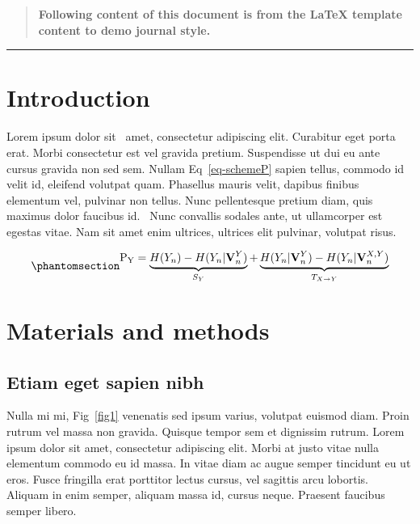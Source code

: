 \documentclass[
  10pt,
  letterpaper,
]{article}
\begin{document}
\begin{quote}
\textbf{Following content of this document is from the LaTeX template
content to demo journal style.}
\end{quote}

\begin{center}\rule{0.5\linewidth}{0.5pt}\end{center}

\section{Introduction}\label{introduction}

Lorem ipsum dolor sit~\citep{bib1} amet, consectetur adipiscing elit.
Curabitur eget porta erat. Morbi consectetur est vel gravida pretium.
Suspendisse ut dui eu ante cursus gravida non sed sem. Nullam
Eq~\ref{eq-schemeP} sapien tellus, commodo id velit id, eleifend
volutpat quam. Phasellus mauris velit, dapibus finibus elementum vel,
pulvinar non tellus. Nunc pellentesque pretium diam, quis maximus dolor
faucibus id.~\citep{bib2} Nunc convallis sodales ante, ut ullamcorper
est egestas vitae. Nam sit amet enim ultrices, ultrices elit pulvinar,
volutpat risus.

\begin{equation}\protect\phantomsection\label{eq-schemeP}{
\begin{aligned}
\mathrm{P_Y} = \underbrace{H(Y_n) - H(Y_n|\mathbf{V}^{Y}_{n})}_{S_Y} + \underbrace{H(Y_n|\mathbf{V}^{Y}_{n})- H(Y_n|\mathbf{V}^{X,Y}_{n})}_{T_{X\rightarrow Y}}
\end{aligned}
}\end{equation}

\section{Materials and methods}\label{materials-and-methods}

\subsection{Etiam eget sapien nibh}\label{etiam-eget-sapien-nibh}

Nulla mi mi, Fig~\ref{fig1} venenatis sed ipsum varius, volutpat euismod
diam. Proin rutrum vel massa non gravida. Quisque tempor sem et
dignissim rutrum. Lorem ipsum dolor sit amet, consectetur adipiscing
elit. Morbi at justo vitae nulla elementum commodo eu id massa. In vitae
diam ac augue semper tincidunt eu ut eros. Fusce fringilla erat
porttitor lectus cursus, vel sagittis arcu lobortis. Aliquam in enim
semper, aliquam massa id, cursus neque. Praesent faucibus semper libero.
\end{document}
